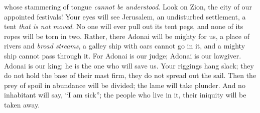 \begin{biblechapter}
whose stammering of tongue \textit{cannot be understood}.
\verse Look on Zion, the city of our appointed festivals! 
Your eyes will see Jerusalem, 
an undisturbed settlement, 
a tent \textit{that is not moved}. 
No one will ever pull out its tent pegs, 
and none of its ropes will be torn in two.
\verse Rather, there Adonai will be mighty for us, 
a place of rivers and \textit{broad streams}, 
a galley ship with oars cannot go in it, 
and a mighty ship cannot pass through it.
\verse For Adonai is our judge; Adonai is our lawgiver. 
Adonai is our king; he is the one who will save us.
\verse Your riggings hang slack; 
they do not hold the base of their mast firm, 
they do not spread out the sail. 
Then the prey of spoil in abundance will be divided; 
the lame will take plunder.
\verse And no inhabitant will say, “I am sick”; 
the people who live in it, their iniquity will be taken away.
\end{biblechapter}

